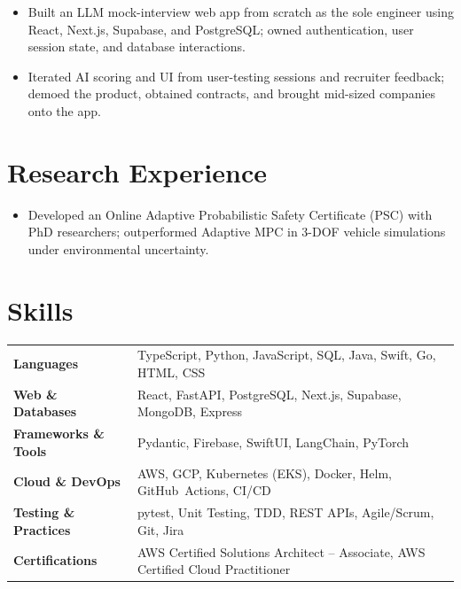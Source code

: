 \documentclass[11pt, letterpaper]{article}
\begin{document}
\begin{itemize}
  \item Built an LLM mock-interview web app from scratch as the sole engineer using React, Next.js, Supabase, and PostgreSQL; owned authentication, user session state, and database interactions.
  \item Iterated AI scoring and UI from user-testing sessions and recruiter feedback; demoed the product, obtained contracts, and brought mid-sized companies onto the app.
\end{itemize}

\section{Research Experience}
\begin{itemize}
  \item Developed an Online Adaptive Probabilistic Safety Certificate (PSC) with PhD researchers; outperformed Adaptive MPC in 3-DOF vehicle simulations under environmental uncertainty.
\end{itemize}

\section{Skills}
\begin{tabularx}{\textwidth}{@{}l @{\hspace{7pt}} >{\raggedright\arraybackslash}X@{}}
  \textbf{Languages} & TypeScript, Python, JavaScript, SQL, Java, Swift, Go, HTML, CSS \\[1pt]
  \textbf{Web \& Databases} & React, FastAPI, PostgreSQL, Next.js, Supabase, MongoDB, Express \\[1pt]
  \textbf{Frameworks \& Tools} & Pydantic, Firebase, SwiftUI, LangChain, PyTorch \\[1pt]
  \textbf{Cloud \& DevOps} & AWS, GCP, Kubernetes (EKS), Docker, Helm, GitHub~Actions, CI/CD \\[1pt]
  \textbf{Testing \& Practices} & pytest, Unit Testing, TDD, REST APIs, Agile/Scrum, Git, Jira \\[1pt]
  \textbf{Certifications} & AWS Certified Solutions Architect -- Associate, AWS Certified Cloud Practitioner \\
\end{tabularx}
\end{document}
